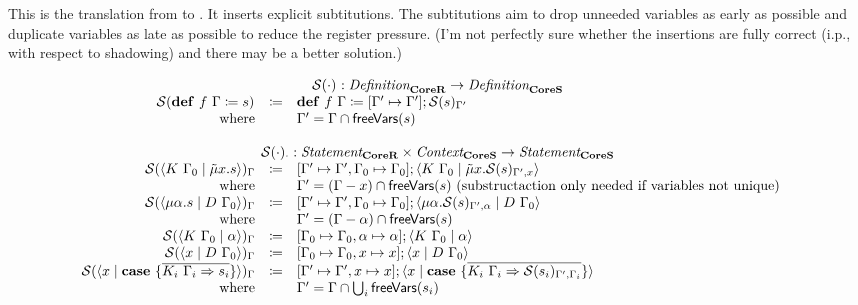 This is the translation from \targetred{} to \targetsub.
It inserts explicit subtitutions.
The subtitutions aim to drop unneeded variables as early as possible and duplicate variables as late as possible to reduce the register pressure.
(I'm not perfectly sure whether the insertions are fully correct (i.p., with respect to shadowing) and there may be a better solution.)

\[
  \begin{array}{rcll}
    \multicolumn{4}{c}{\substruct{\cdot}{} : \emph{Definition}_{\targetred{}} \rightarrow \emph{Definition}_{\targetsub{}}}\\
    \substruct{\defi{f\ \Gamma}{s}}{} & \coloneq & \defi{f\ \Gamma}{\substitute{\Gamma' \mapsto \Gamma'}{\substruct{s}{\Gamma'}}} & \\
    \text{where} &  & \Gamma' = \Gamma \cap \free{s} & \\
    \\
    \multicolumn{4}{c}{\substruct{\cdot}{\cdot} : \emph{Statement}_{\targetred{}} \times \emph{Context}_{\targetsub{}} \rightarrow \emph{Statement}_{\targetsub{}}}\\
    \substruct{\cut{K\ \Gamma_0}{\tilde{\mu}x.s}}{\Gamma} & \coloneq & \substitute{\Gamma' \mapsto \Gamma', \Gamma_0 \mapsto \Gamma_0}{\cut{K\ \Gamma_0}{\tilde{\mu}x.\substruct{s}{\Gamma', x}}} & \\
    \text{where} &  & \Gamma' = (\Gamma - x) \cap \free{s} \text{ (substructaction only needed if variables not unique)} & \\
    \substruct{\cut{\mu\alpha.s}{D\ \Gamma_0}}{\Gamma} & \coloneq & \substitute{\Gamma' \mapsto \Gamma', \Gamma_0 \mapsto \Gamma_0}{\cut{\mu\alpha.\substruct{s}{\Gamma', \alpha}}{D\ \Gamma_0}} & \\
    \text{where} &  & \Gamma' = (\Gamma - \alpha) \cap \free{s} & \\
    \substruct{\cut{K\ \Gamma_0}{\alpha}}{\Gamma} & \coloneq & \substitute{\Gamma_0 \mapsto \Gamma_0, \alpha \mapsto \alpha}{\cut{K\ \Gamma_0}{\alpha}} & \\
    \substruct{\cut{x}{D\ \Gamma_0}}{\Gamma} & \coloneq & \substitute{\Gamma_0 \mapsto \Gamma_0, x \mapsto x}{\cut{x}{D\ \Gamma_0}} & \\
    \substruct{\cut{x}{\case{\overline{K_i\ \Gamma_i \Rightarrow s_i}}}}{\Gamma} & \coloneq & \substitute{\Gamma' \mapsto \Gamma', x \mapsto x}{\cut{x}{\case{\overline{K_i\ \Gamma_i \Rightarrow \substruct{s_i}{\Gamma', \Gamma_i}}}}} & \\
    \text{where} &  & \Gamma' = \Gamma \cap \bigcup_i \free{s_i} & \\

\end{array}\]
